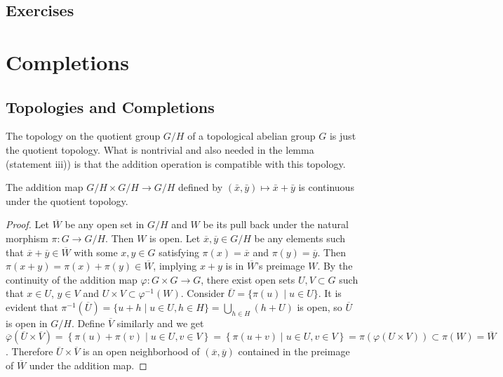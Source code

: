 \documentclass{note}
\begin{document}
\section*{Exercises}
\setcounter{chapter}{9}

\chapter{Completions}

\section*{Topologies and Completions}

The topology on the quotient group $G/H$ of a topological abelian group $G$ is
just the quotient topology. What is nontrivial and also needed in the lemma
(statement iii)) is that the addition operation is compatible with this
topology.

\begin{lemma*}
  The addition map $G/H \times G/H \to G/H$ defined by $(\bar{x},\bar{y}) \mapsto
    \bar{x}+\bar{y}$ is continuous under the quotient topology.
\end{lemma*}

\begin{proof}
  Let $\overline{W}$ be any open set in $G/H$ and $W$ be its pull back under the
  natural morphism $\pi\colon G \to G/H$. Then $W$ is open. Let $\overline{x},
    \overline{y} \in G/H$ be any elements such that $\overline{x} + \overline{y}
    \in \overline{W}$ with some $x, y \in G$ satisfying $\pi(x) = \overline{x}$ and
  $\pi(y) = \overline{y}$. Then $\pi(x + y) = \pi(x) + \pi(y) \in
    \overline{W}$,
  implying $x + y$ is in $\overline{W}$'s preimage $W$. By the continuity of the
  addition map $\varphi\colon G \times G \to G$, there exist open sets $U,V
    \subset G$ such that $x\in U$, $y\in V$ and $U\times V \subset
    \varphi^{-1}(W)$. Consider $\overline{U} = \{\pi(u) \mid u \in U\}$. It is
  evident that $\pi^{-1}\left(\overline{U}\right) = \{u+h \mid u \in U, h \in H\}
    = \bigcup_{h\in H}(h+U)$ is open, so $\overline{U}$ is open in $G/H$. Define
  $\overline{V}$ similarly and we get
  $\overline\varphi\left(\overline{U}\times\overline{V}\right) =
    \left\{\pi(u)+\pi(v) \mid u\in U, v\in
    V\right\} = \left\{\pi(u+v) \mid u\in U,
    v\in V\right\} = \pi\left(\varphi\left(U\times V\right)\right) \subset \pi(W) =
    \overline{W}$. Therefore $\overline{U} \times \overline{V}$ is an open
  neighborhood of $\left(\overline{x}, \overline{y}\right)$ contained in the
  preimage of $\overline{W}$ under the addition map.
\end{proof}
\end{document}
